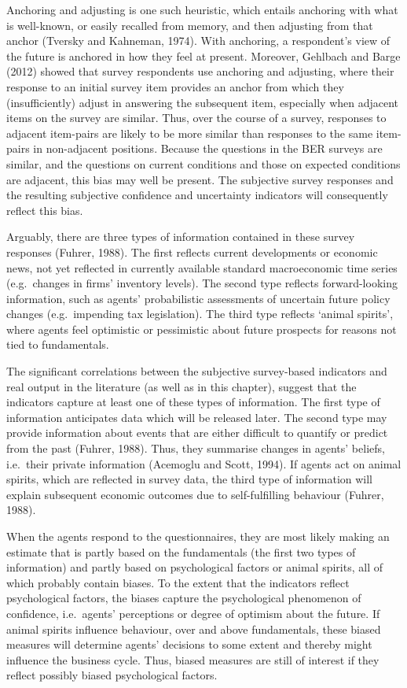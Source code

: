 \documentclass[11pt,]{article}
\begin{document}
Anchoring and adjusting is one such heuristic, which entails anchoring
with what is well-known, or easily recalled from memory, and then
adjusting from that anchor (Tversky and Kahneman, 1974). With anchoring,
a respondent's view of the future is anchored in how they feel at
present. Moreover, Gehlbach and Barge (2012) showed that survey
respondents use anchoring and adjusting, where their response to an
initial survey item provides an anchor from which they (insufficiently)
adjust in answering the subsequent item, especially when adjacent items
on the survey are similar. Thus, over the course of a survey, responses
to adjacent item-pairs are likely to be more similar than responses to
the same item-pairs in non-adjacent positions. Because the questions in
the BER surveys are similar, and the questions on current conditions and
those on expected conditions are adjacent, this bias may well be
present. The subjective survey responses and the resulting subjective
confidence and uncertainty indicators will consequently reflect this
bias.

Arguably, there are three types of information contained in these survey
responses (Fuhrer, 1988). The first reflects current developments or
economic news, not yet reflected in currently available standard
macroeconomic time series (e.g.~changes in firms' inventory levels). The
second type reflects forward-looking information, such as agents'
probabilistic assessments of uncertain future policy changes
(e.g.~impending tax legislation). The third type reflects `animal
spirits', where agents feel optimistic or pessimistic about future
prospects for reasons not tied to fundamentals.

The significant correlations between the subjective survey-based
indicators and real output in the literature (as well as in this
chapter), suggest that the indicators capture at least one of these
types of information. The first type of information anticipates data
which will be released later. The second type may provide information
about events that are either difficult to quantify or predict from the
past (Fuhrer, 1988). Thus, they summarise changes in agents' beliefs,
i.e.~their private information (Acemoglu and Scott, 1994). If agents act
on animal spirits, which are reflected in survey data, the third type of
information will explain subsequent economic outcomes due to
self-fulfilling behaviour (Fuhrer, 1988).

When the agents respond to the questionnaires, they are most likely
making an estimate that is partly based on the fundamentals (the first
two types of information) and partly based on psychological factors or
animal spirits, all of which probably contain biases. To the extent that
the indicators reflect psychological factors, the biases capture the
psychological phenomenon of confidence, i.e.~agents' perceptions or
degree of optimism about the future. If animal spirits influence
behaviour, over and above fundamentals, these biased measures will
determine agents' decisions to some extent and thereby might influence
the business cycle. Thus, biased measures are still of interest if they
reflect possibly biased psychological factors.
\end{document}
